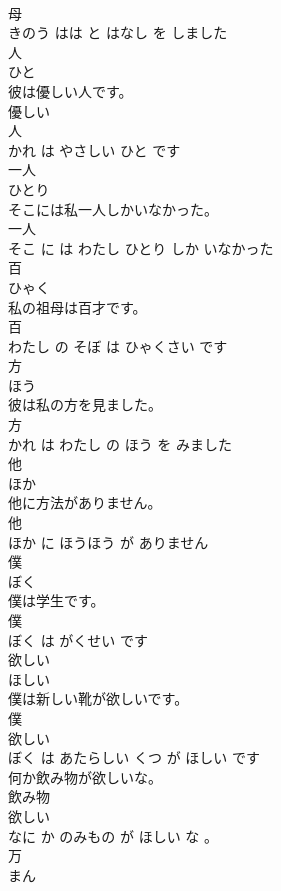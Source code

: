 \documentclass[8pt]{extreport}
\begin{document}
\begin{CJK}{UTF8}{min}
\\	母 
\\	きのう はは と はなし を しました			
\\	人	
\\	ひと			
\\	彼は優しい人です。	
\\	優しい 
\\	人 
\\	かれ は やさしい ひと です			
\\	一人	
\\	ひとり			
\\	そこには私一人しかいなかった。	
\\	一人 
\\	そこ に は わたし ひとり しか いなかった			
\\	百	
\\	ひゃく			
\\	私の祖母は百才です。	
\\	百 
\\	わたし の そぼ は ひゃくさい です			
\\	方	
\\	ほう			
\\	彼は私の方を見ました。	
\\	方 
\\	かれ は わたし の ほう を みました			
\\	他	
\\	ほか			
\\	他に方法がありません。	
\\	他 
\\	ほか に ほうほう が ありません			
\\	僕	
\\	ぼく			
\\	僕は学生です。	
\\	僕 
\\	ぼく は がくせい です			
\\	欲しい	
\\	ほしい			
\\	僕は新しい靴が欲しいです。	
\\	僕 
\\	欲しい 
\\	ぼく は あたらしい くつ が ほしい です			
\\	何か飲み物が欲しいな。	
\\	飲み物 
\\	欲しい 
\\	なに か のみもの が ほしい な 。			
\\	万	
\\	まん			

\end{CJK}
\end{document}
